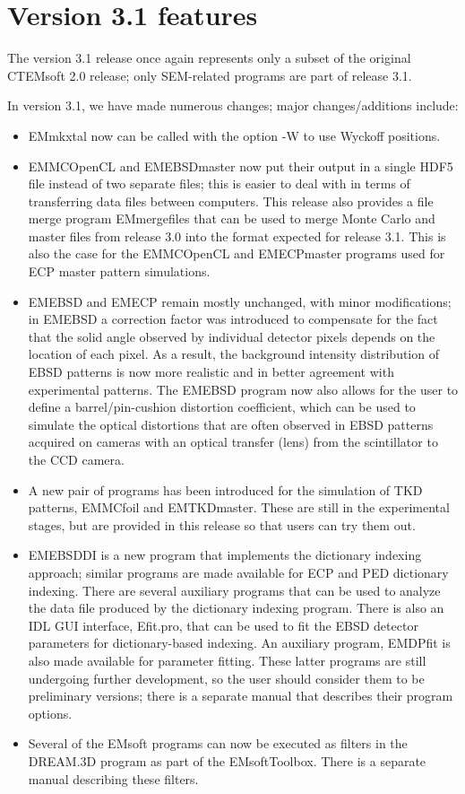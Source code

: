 \documentclass[DIV=calc, paper=letter, fontsize=11pt]{scrartcl}	 %
\begin{document}
\newpage
\section{Version 3.1 features}
The version 3.1 release once again represents only a subset of the original CTEMsoft 2.0 release; only SEM-related programs are part of release 3.1.  

In version 3.1, we have made numerous changes; major changes/additions include:
\begin{itemize}
	\item \textsf{EMmkxtal} now can be called with the option -W to use Wyckoff positions.
	\item \textsf{EMMCOpenCL} and \textsf{EMEBSDmaster} now put their output in a single HDF5 file instead of two separate files; this is easier to deal with in terms of transferring data files
	between computers.  This release also provides a file merge program \textsf{EMmergefiles} that can be used to merge Monte Carlo and master files from release 3.0 into the format expected
	for release 3.1.  This is also the case for the \textsf{EMMCOpenCL} and \textsf{EMECPmaster} programs used for ECP master pattern simulations.
	\item \textsf{EMEBSD} and \textsf{EMECP} remain mostly unchanged, with minor modifications; in \textsf{EMEBSD} a correction factor was introduced to compensate for the fact that the solid angle observed 
	by individual detector pixels depends on the location of each pixel. As a result, the background intensity distribution of EBSD patterns is now more realistic and in better agreement with 
	experimental patterns.  The \textsf{EMEBSD} program now also allows for the user to define a barrel/pin-cushion distortion coefficient, which can be used to simulate the optical distortions 
	that are often observed in EBSD patterns acquired on cameras with an optical transfer (lens) from the scintillator to the CCD camera.
	\item A new pair of programs has been introduced for the simulation of TKD patterns, \textsf{EMMCfoil} and \textsf{EMTKDmaster}.  These are still in the experimental stages, but are provided in 
	this release so that users can try them out.
	\item \textsf{EMEBSDDI} is a new program that implements the dictionary indexing approach; similar programs are made available for ECP and PED dictionary indexing.   There are
	several auxiliary programs that can be used to analyze the data file produced by the dictionary indexing program.  There is also an IDL GUI interface, \textsf{Efit.pro}, that can be used
	to fit the EBSD detector parameters for dictionary-based indexing.  An auxiliary program, \textsf{EMDPfit} is also made available for parameter fitting.  These latter programs are 
	still undergoing further development, so the user should consider them to be preliminary versions; there is a separate manual that describes their program options.
	\item Several of the \textsf{EMsoft} programs can now be executed as filters in the \textsf{DREAM.3D} program as part of the \textsf{EMsoftToolbox}.  There is a separate manual describing these filters.
\end{itemize}
\end{document}
